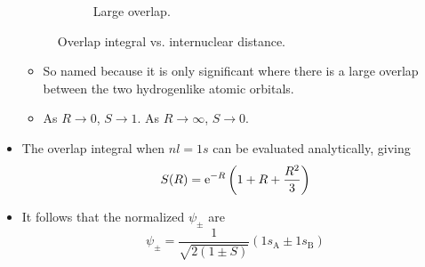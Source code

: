 \documentclass[../notes.tex]{subfiles}
\begin{document}
\begin{itemize}
\begin{figure}[h!]
\begin{subfigure}[b]{0.4\linewidth}
            \caption{Large overlap.}
            \label{fig:overlapIntegralb}
        \end{subfigure}
        \caption{Overlap integral vs. internuclear distance.}
        \label{fig:overlapIntegral}
    \end{figure}
    \begin{itemize}
        \item So named because it is only significant where there is a large overlap between the two hydrogenlike atomic orbitals.
        \item As $R\to 0$, $S\to 1$. As $R\to\infty$, $S\to 0$.
    \end{itemize}
    \item The overlap integral when $nl=1s$ can be evaluated analytically, giving
    \begin{equation*}
        S(R) = \e[-R]\left( 1+R+\frac{R^2}{3} \right)
    \end{equation*}
    \item It follows that the normalized $\psi_\pm$ are
    \begin{equation*}
        \psi_\pm = \frac{1}{\sqrt{2(1\pm S)}}(1s_\text{A}\pm 1s_\text{B})
    \end{equation*}
\end{itemize}
\end{document}
